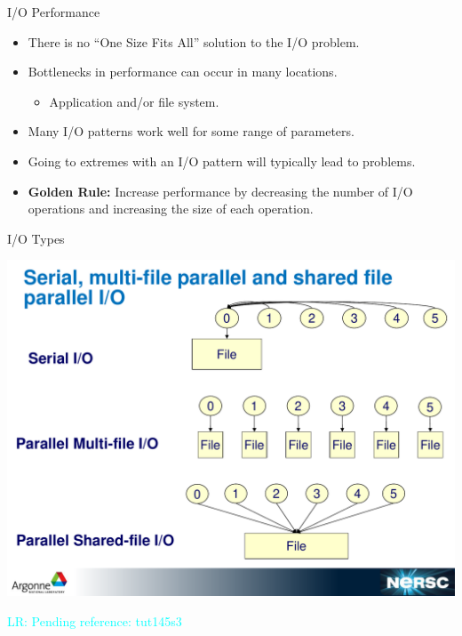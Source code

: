 \documentclass[compress,11pt,xcolor=svgnames,aspectratio=169]{beamer}
\newcommand{\lr}[1]{\textcolor{cyan}{LR: #1}}
\begin{document}
\begin{frame}[fragile]{I/O Performance}

\begin{itemize}
\setlength\itemsep{0.5cm}

  \item There is no ``One Size Fits All'' solution to the I/O problem.

  \item Bottlenecks in performance can occur in many locations.

  \begin{itemize}
    \item Application and/or file system.
  \end{itemize}

  \item Many I/O patterns work well for some range of parameters.

  \item Going to extremes with an I/O pattern will typically lead to problems.

  \item {\color{gold}\textbf{Golden Rule:}} Increase performance by decreasing the number of I/O operations and increasing the size of each operation.

\end{itemize}

\nocite{PIOTAPO12}

\end{frame}

\begin{frame}[fragile]{I/O Types}

\begin{center}
\includegraphics[scale=0.35]{io-types}
\end{center}

\lr{Pending reference: tut145s3}

\end{frame}
\end{document}
